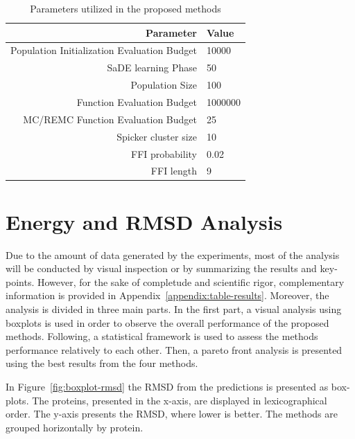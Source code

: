 \begin{table}[ht]
    \centering
    \begin{tabular}{r|l} \hline \hline
        Parameter & Value \\ \hline \hline
        Population Initialization Evaluation Budget & 10000 \\ \hline
        SaDE learning Phase & 50 \\ \hline
        Population Size & 100 \\ \hline
        Function Evaluation Budget & 1000000 \\ \hline
        MC/REMC Function Evaluation Budget & 25 \\ \hline
        Spicker cluster size & 10 \\ \hline
        \ac{FFI} probability & 0.02 \\ \hline
        \ac{FFI} length & 9 \\ \hline \hline
    \end{tabular}
    \caption{Parameters utilized in the proposed methods}
    \label{tab:parameters}
\end{table}

\section{Energy and RMSD Analysis}\label{sec:methods-analysis}

Due to the amount of data generated by the experiments, most of the analysis will
be conducted by visual inspection or by summarizing the results and key-points.
However, for the sake of completude and scientific rigor, complementary
information is provided in Appendix~\ref{appendix:table-results}.
Moreover, the analysis is divided in three main parts. In the first part, a visual
analysis using boxplots is used in order to observe the overall performance of
the proposed methods. Following, a statistical framework is used to assess the methods
performance relatively to each other. Then, a pareto front analysis is presented
using the best results from the four methods.

In Figure~\ref{fig:boxplot-rmsd} the RMSD from the predictions is presented as box-plots.
The proteins, presented in the x-axis, are displayed in lexicographical order.
The y-axis presents the RMSD, where lower is better. The methods are grouped
horizontally by protein.

